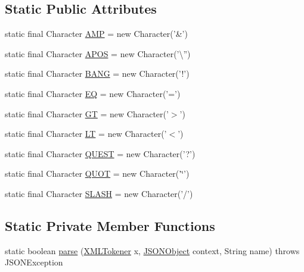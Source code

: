 \subsection*{Static Public Attributes}
\begin{DoxyCompactItemize}
\item 
static final Character \hyperlink{classorg_1_1json_1_1_x_m_l_a2ed9b74a6dcc1a3833460cb35b72a8e2}{A\-M\-P} = new Character('\&')
\item 
static final Character \hyperlink{classorg_1_1json_1_1_x_m_l_afc1bccac3be808ee0cc80e6c5261226a}{A\-P\-O\-S} = new Character('\textbackslash{}'')
\item 
static final Character \hyperlink{classorg_1_1json_1_1_x_m_l_a15eadac312b9e5b2d8590be2d92cc24f}{B\-A\-N\-G} = new Character('!')
\item 
static final Character \hyperlink{classorg_1_1json_1_1_x_m_l_a79c30d409011e7c5bbffe3a9dd487b19}{E\-Q} = new Character('=')
\item 
static final Character \hyperlink{classorg_1_1json_1_1_x_m_l_a0a9f1aaef15f78d43c532e601546a722}{G\-T} = new Character('$>$')
\item 
static final Character \hyperlink{classorg_1_1json_1_1_x_m_l_a12c351d05c7c78c4730d1ec44ae6b798}{L\-T} = new Character('$<$')
\item 
static final Character \hyperlink{classorg_1_1json_1_1_x_m_l_a6ee91c7c64c44b62b197a69b00ee383f}{Q\-U\-E\-S\-T} = new Character('?')
\item 
static final Character \hyperlink{classorg_1_1json_1_1_x_m_l_a4a8e56f228505f24fd24b70914d5078c}{Q\-U\-O\-T} = new Character('\char`\"{}')
\item 
static final Character \hyperlink{classorg_1_1json_1_1_x_m_l_aaa9a255bc94655b02d65b2c8525e5188}{S\-L\-A\-S\-H} = new Character('/')
\end{DoxyCompactItemize}
\subsection*{Static Private Member Functions}
\begin{DoxyCompactItemize}
\item 
static boolean \hyperlink{classorg_1_1json_1_1_x_m_l_abd896155783c155cd477df9dd9d6eabf}{parse} (\hyperlink{classorg_1_1json_1_1_x_m_l_tokener}{X\-M\-L\-Tokener} x, \hyperlink{classorg_1_1json_1_1_j_s_o_n_object}{J\-S\-O\-N\-Object} context, String name)  throws J\-S\-O\-N\-Exception 
\end{DoxyCompactItemize}


